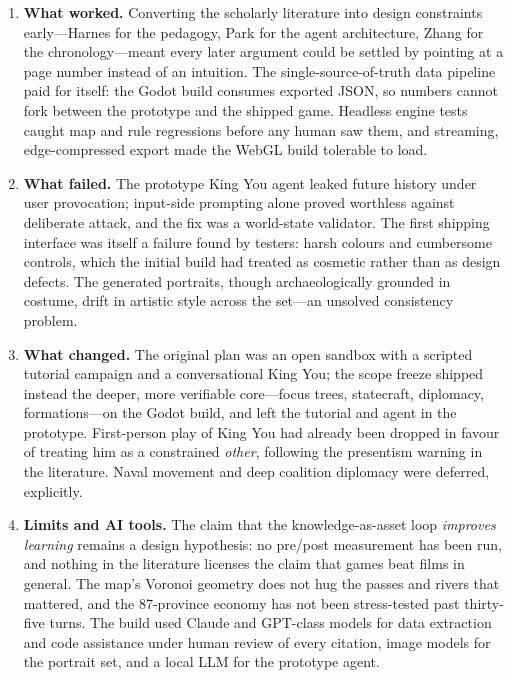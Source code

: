 \documentclass[12pt,a4paper]{article}
\renewcommand{\footnotesize}{\fontsize{10}{12}\selectfont}
\begin{document}
\begin{enumerate}
  \item \textbf{What worked.} Converting the scholarly literature into design
  constraints early---Harnes for the pedagogy, Park for the agent
  architecture, Zhang for the chronology---meant every later argument could
  be settled by pointing at a page number instead of an intuition. The
  single-source-of-truth data pipeline paid for itself: the Godot build
  consumes exported JSON, so numbers cannot fork between the prototype and
  the shipped game. Headless engine tests caught map and rule regressions
  before any human saw them, and streaming, edge-compressed export made the
  WebGL build tolerable to load.
  \item \textbf{What failed.} The prototype King You agent leaked future
  history under user provocation; input-side prompting alone proved worthless
  against deliberate attack, and the fix was a world-state validator. The
  first shipping interface was itself a failure found by testers: harsh
  colours and cumbersome controls, which the initial build had treated as
  cosmetic rather than as design defects. The generated portraits, though
  archaeologically grounded in costume, drift in artistic style across the
  set---an unsolved consistency problem.
  \item \textbf{What changed.} The original plan was an open sandbox with a
  scripted tutorial campaign and a conversational King You; the scope freeze
  shipped instead the deeper, more verifiable core---focus trees, statecraft,
  diplomacy, formations---on the Godot build, and left the tutorial and agent
  in the prototype. First-person play of King You had already been dropped in
  favour of treating him as a constrained \emph{other}, following the
  presentism warning in the literature. Naval movement and deep coalition
  diplomacy were deferred, explicitly.
  \item \textbf{Limits and AI tools.} The claim that the knowledge-as-asset
  loop \emph{improves learning} remains a design hypothesis: no pre/post
  measurement has been run, and nothing in the literature licenses the claim
  that games beat films in general. The map's Voronoi geometry does not hug
  the passes and rivers that mattered, and the 87-province economy has not
  been stress-tested past thirty-five turns. The build used Claude and
  GPT-class models for data extraction and code assistance under human review
  of every citation, image models for the portrait set, and a local LLM for
  the prototype agent.
\end{enumerate}

\singlespacing
\footnotesize
\printbibliography[title={Bibliography}]
\end{document}
